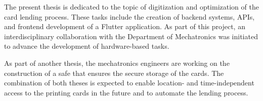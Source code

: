 \noindent
The present thesis is dedicated to the topic of digitization and optimization of the card lending process. These tasks include the creation of backend systems, APIs, and frontend development of a Flutter application. As part of this project, an interdisciplinary collaboration with the Department of Mechatronics was initiated to advance the development of hardware-based tasks.

As part of another thesis, the mechatronics engineers are working on the construction of a safe that ensures the secure storage of the cards. The combination of both theses is expected to enable location- and time-independent access to the printing cards in the future and to automate the lending process.